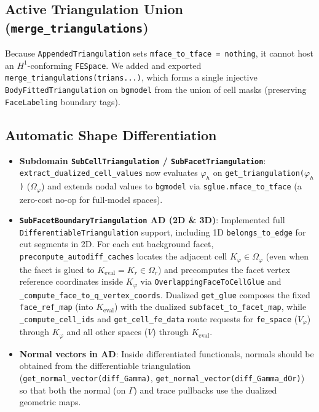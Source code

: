 \documentclass[11pt,a4paper]{article}
\begin{document}
\subsection{Active Triangulation Union (\texttt{merge\_triangulations})}
Because \texttt{AppendedTriangulation} sets \texttt{mface\_to\_tface = nothing}, it cannot host an $H^1$-conforming \texttt{FESpace}. We added and exported \texttt{merge\_triangulations(trians...)}, which forms a single injective \texttt{BodyFittedTriangulation} on \texttt{bgmodel} from the union of cell masks (preserving \texttt{FaceLabeling} boundary tags).

\subsection{Automatic Shape Differentiation}
\begin{itemize}
  \item \textbf{Subdomain \texttt{SubCellTriangulation} / \texttt{SubFacetTriangulation}}: \texttt{extract\_dualized\_cell\_values} now evaluates $\varphi_h$ on \texttt{get\_triangulation($\varphi_h$)} ($\Omega_\varphi$) and extends nodal values to \texttt{bgmodel} via \texttt{sglue.mface\_to\_tface} (a zero-cost no-op for full-model spaces).
  \item \textbf{\texttt{SubFacetBoundaryTriangulation} AD (2D \& 3D)}: Implemented full \texttt{DifferentiableTriangulation} support, including 1D \texttt{belongs\_to\_edge} for cut segments in 2D. For each cut background facet, \texttt{precompute\_autodiff\_caches} locates the adjacent cell $K_\varphi \in \Omega_\varphi$ (even when the facet is glued to $K_{\mathrm{eval}} = K_r \in \Omega_r$) and precomputes the facet vertex reference coordinates inside $K_\varphi$ via \texttt{OverlappingFaceToCellGlue} and \texttt{\_compute\_face\_to\_q\_vertex\_coords}. Dualized \texttt{get\_glue} composes the fixed \texttt{face\_ref\_map} (into $K_{\mathrm{eval}}$) with the dualized \texttt{subfacet\_to\_facet\_map}, while \texttt{\_compute\_cell\_ids} and \texttt{get\_cell\_fe\_data} route requests for \texttt{fe\_space} ($V_\varphi$) through $K_\varphi$ and all other spaces ($V$) through $K_{\mathrm{eval}}$.
  \item \textbf{Normal vectors in AD}: Inside differentiated functionals, normals should be obtained from the differentiable triangulation (\texttt{get\_normal\_vector(diff\_Gamma)}, \texttt{get\_normal\_vector(diff\_Gamma\_dOr)}) so that both the normal (on $\Gamma$) and trace pullbacks use the dualized geometric maps.
\end{itemize}
\end{document}
